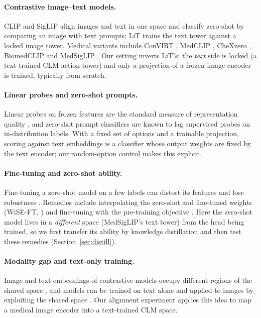 \documentclass[11pt]{article}
\begin{document}
\paragraph{Contrastive image--text models.} CLIP \citep{radford2021clip} and SigLIP \citep{zhai2023siglip} align
images and text in one space and classify zero-shot by comparing an image with text prompts; LiT
\citep{zhai2022lit} trains the text tower against a locked image tower. Medical variants include ConVIRT
\citep{zhang2022convirt}, MedCLIP \citep{wang2022medclip}, CheXzero \citep{tiu2022chexzero}, BiomedCLIP
\citep{zhang2023biomedclip} and MedSigLIP \citep{sellergren2025medgemma}.
Our setting inverts LiT's: the \emph{text} side is locked (a text-trained CLM action tower) and only a projection
of a frozen image encoder is trained, typically from scratch.

\paragraph{Linear probes and zero-shot prompts.} Linear probes on frozen features are the standard measure of
representation quality \citep{kornblith2019better,radford2021clip}, and zero-shot prompt classifiers are known to
lag supervised probes on in-distribution labels. With a fixed set of options and a trainable projection, scoring
against text embeddings is a classifier whose output weights are fixed by the text encoder; our random-option
control makes this explicit.

\paragraph{Fine-tuning and zero-shot ability.} Fine-tuning a zero-shot model on a few labels can distort its
features and lose robustness \citep{kumar2022finetuning}. Remedies include interpolating the zero-shot and
fine-tuned weights (WiSE-FT, \citealp{wortsman2022wiseft}) and fine-tuning with the pre-training objective
\citep{goyal2023flyp}. Here the zero-shot model lives in a \emph{different} space (MedSigLIP's text tower) from the
head being trained, so we first transfer its ability by knowledge distillation \citep{hinton2015distilling} and
then test these remedies (Section~\ref{sec:distill}).

\paragraph{Modality gap and text-only training.} Image and text embeddings of contrastive models occupy different
regions of the shared space \citep{liang2022mindthegap}, and models can be trained on text alone and applied to
images by exploiting the shared space \citep{nukrai2022capdec}. Our alignment experiment applies this idea to map
a medical image encoder into a text-trained CLM space.
\end{document}
